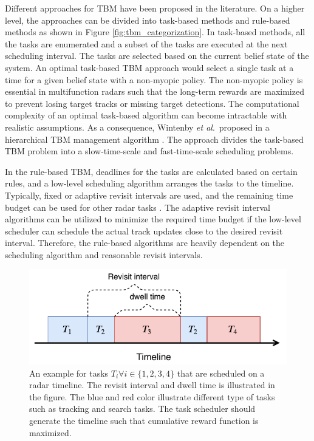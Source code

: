 \documentclass[english, 12pt, a4paper, elec, utf8, a-1b, online]{aaltothesis}
\newcommand{\etal}{\textit{et al}.~}
\begin{document}
Different approaches for TBM have been proposed in the literature.
On a higher level, the approaches can be divided into task-based methods and rule-based methods as shown in Figure \ref{fig:tbm_categorization}.
In task-based methods, all the tasks are enumerated and a subset of the tasks are executed at the next scheduling interval.
The tasks are selected based on the current belief state of the system. 
An optimal task-based TBM approach would select a single task at a time for a given belief state with a non-myopic policy.
The non-myopic policy is essential in multifunction radars such that the long-term rewards are maximized to prevent losing target tracks or missing target detections.
The computational complexity of an optimal task-based algorithm can become intractable with realistic assumptions. 
As a consequence, Wintenby \etal proposed in \cite{Wintenby2006} a hierarchical TBM management algorithm \cite{Wintenby2006}.
The approach divides the task-based TBM problem into a slow-time-scale and fast-time-scale scheduling problems.

In the rule-based TBM, deadlines for the tasks are calculated based on certain rules, and a low-level scheduling algorithm arranges the tasks to the timeline.
Typically, fixed or adaptive revisit intervals are used, and the remaining time budget can be used for other radar tasks  \cite{Keuk1975, Cohen1986, Gardner1988, Munu1992, vanKeuk1993, Watson1993, Daeipour1994, Shin1995, Benoudnine2006, ChengTing2007, Baek2010, Charlish2015, Mofrad2017, Masoumi-Ganjgah2017, Christiansen2018, Pilte2018}.
The adaptive revisit interval algorithms can be utilized to minimize the required time budget if the low-level scheduler can schedule the actual track updates close to the desired revisit interval.
Therefore, the rule-based algorithms are heavily dependent on the scheduling algorithm and reasonable revisit intervals.


\begin{figure}[h]
    \centering
    \includegraphics{figures/timeline.pdf}
    \caption{
        An example for tasks $T_i \forall i\in\{1,2,3,4\}$ that are scheduled on a radar timeline. 
        The revisit interval and dwell time is illustrated in the figure.
        The blue and red color illustrate different type of tasks such as tracking and search tasks.
        The task scheduler should generate the timeline such that cumulative reward function is maximized. 
    }
    \label{fig:timeline}
\end{figure}
\end{document}
